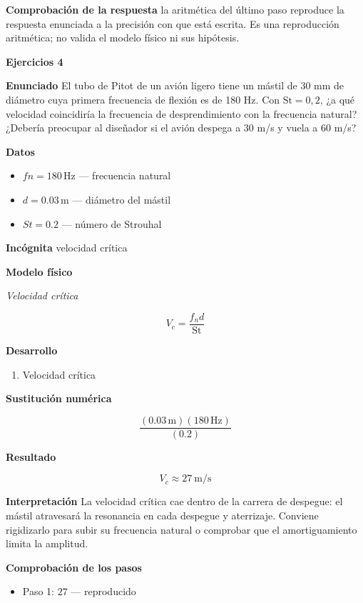 \documentclass[10pt,openany]{book}
\begin{document}
\noindent\textbf{Comprobación de la respuesta} la aritmética del último paso reproduce la respuesta enunciada a la precisión con que está escrita. Es una reproducción aritmética; no valida el modelo físico ni sus hipótesis.

\noindent\textbf{Ejercicios 4}

\noindent\textbf{Enunciado}
El tubo de Pitot de un avión ligero tiene un mástil de 30 mm de diámetro cuya primera frecuencia de flexión es de 180 Hz. Con \(\mathrm{St} = 0{,}2\), ¿a qué velocidad coincidiría la frecuencia de desprendimiento con la frecuencia natural? ¿Debería preocupar al diseñador si el avión despega a 30 m/s y vuela a 60 m/s?

\noindent\textbf{Datos}
\begin{itemize}
\item $fn = 180\,\mathrm{Hz}$ — frecuencia natural
\item $d = 0.03\,\mathrm{m}$ — diámetro del mástil
\item $St = 0.2$ — número de Strouhal
\end{itemize}

\noindent\textbf{Incógnita}
velocidad crítica

\noindent\textbf{Modelo físico}

\noindent\textit{Velocidad crítica}

\[
V_c = \frac{f_n d}{\mathrm{St}}
\]

\noindent\textbf{Desarrollo}
\begin{enumerate}
\item
Velocidad crítica
\end{enumerate}

\noindent\textbf{Sustitución numérica}

\[
\frac{\left(0.03\,\mathrm{m}\right) \left(180\,\mathrm{Hz}\right)}{\left(0.2\right)}
\]

\noindent\textbf{Resultado}

\[
V_c \approx 27\ \mathrm{m/s}
\]

\noindent\textbf{Interpretación}
La velocidad crítica cae dentro de la carrera de despegue: el mástil atravesará la resonancia en cada despegue y aterrizaje. Conviene rigidizarlo para subir su frecuencia natural o comprobar que el amortiguamiento limita la amplitud.

\noindent\textbf{Comprobación de los pasos}
\begin{itemize}
\item Paso 1: $27$ — reproducido
\end{itemize}
\end{document}
